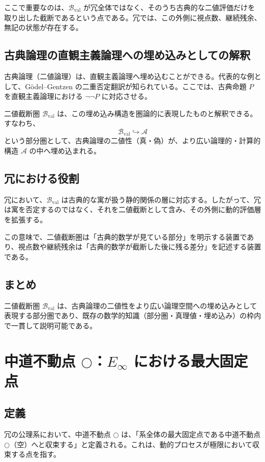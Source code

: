 \documentclass[a4paper,11pt]{article}
\newcommand{\dfix}{\bigcirc}
\begin{document}
ここで重要なのは、$\mathcal{B}_{\mathrm{val}}$ が冗全体ではなく、そのうち古典的な二値評価だけを取り出した截断であるという点である。冗では、この外側に視点数、継続残余、無記の状態が存在する。

\subsection{古典論理の直観主義論理への埋め込みとしての解釈}
古典論理（二値論理）は、直観主義論理へ埋め込むことができる。代表的な例として、Gödel--Gentzen の二重否定翻訳が知られている。ここでは、古典命題 $P$ を直観主義論理における $\neg\neg P$ に対応させる。

二値截断圏 $\mathcal{B}_{\mathrm{val}}$ は、この埋め込み構造を圏論的に表現したものと解釈できる。すなわち、
\[
\mathcal{B}_{\mathrm{val}} \hookrightarrow \mathcal{A}
\]
という部分圏として、古典論理の二値性（真・偽）が、より広い論理的・計算的構造 $\mathcal{A}$ の中へ埋め込まれる。

\subsection{冗における役割}
冗において、$\mathcal{B}_{\mathrm{val}}$ は古典的な寓が扱う静的関係の層に対応する。したがって、冗は寓を否定するのではなく、それを二値截断として含み、その外側に動的評価層を拡張する。

この意味で、二値截断圏は「古典的数学が見ている部分」を明示する装置であり、視点数や継続残余は「古典的数学が截断した後に残る差分」を記述する装置である。

\subsection{まとめ}
二値截断圏 $\mathcal{B}_{\mathrm{val}}$ は、古典論理の二値性をより広い論理空間への埋め込みとして表現する部分圏であり、既存の数学的知識（部分圏・真理値・埋め込み）の枠内で一貫して説明可能である。

\section{中道不動点 \texorpdfstring{$\dfix$}{dfix}：\texorpdfstring{$E_\infty$}{E∞} における最大固定点}

\subsection{定義}
冗の公理系において、中道不動点 $\dfix$ は、「系全体の最大固定点である中道不動点 $\dfix$（空）へと収束する」と定義される。これは、動的プロセスが極限において収束する点を指す。
\end{document}

